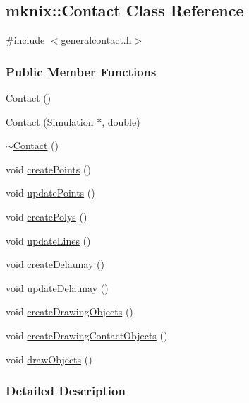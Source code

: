 \hypertarget{classmknix_1_1_contact}{}\subsection{mknix\+:\+:Contact Class Reference}
\label{classmknix_1_1_contact}


{\ttfamily \#include $<$generalcontact.\+h$>$}

\subsubsection*{Public Member Functions}
\begin{DoxyCompactItemize}
\item 
\hyperlink{classmknix_1_1_contact_acddf7d86870e1d015ca17a1f94533127}{Contact} ()
\item 
\hyperlink{classmknix_1_1_contact_a4bab5ac8e3e65ba5c7dda16de9451fd8}{Contact} (\hyperlink{classmknix_1_1_simulation}{Simulation} $\ast$, double)
\item 
\hyperlink{classmknix_1_1_contact_a409ca0c936dcc34ce4ca1b25780b7635}{$\sim$\+Contact} ()
\item 
void \hyperlink{classmknix_1_1_contact_aff0010eaf0d50819b7cc502449443b71}{create\+Points} ()
\item 
void \hyperlink{classmknix_1_1_contact_a0a9eb3950c6d13b5241cb8a58d9ad11e}{update\+Points} ()
\item 
void \hyperlink{classmknix_1_1_contact_a5334a5c12debb8d064345929201673f6}{create\+Polys} ()
\item 
void \hyperlink{classmknix_1_1_contact_a1f363d51121555347584e34cd880ef12}{update\+Lines} ()
\item 
void \hyperlink{classmknix_1_1_contact_aac0574d8683e781d6f811c782f9604c8}{create\+Delaunay} ()
\item 
void \hyperlink{classmknix_1_1_contact_acd4f6166d705a7641a84aae19fb0ffb3}{update\+Delaunay} ()
\item 
void \hyperlink{classmknix_1_1_contact_a3489052672cf092120e096649448eebb}{create\+Drawing\+Objects} ()
\item 
void \hyperlink{classmknix_1_1_contact_a17e1256371ff92d395ef71e23396b509}{create\+Drawing\+Contact\+Objects} ()
\item 
void \hyperlink{classmknix_1_1_contact_a86ab86ad903f956284324fc2fb69e195}{draw\+Objects} ()
\end{DoxyCompactItemize}


\subsubsection{Detailed Description}


